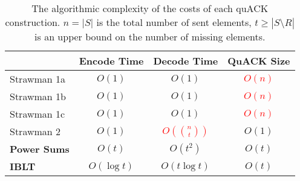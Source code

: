 \begin{table*}[ht]
  \centering

  \begin{subtable}[b]{\linewidth}
  \centering
  \begin{tabular}{lccc}
    \toprule
    & \bf Encode Time & \bf Decode Time & \bf QuACK Size \\
    \midrule
    Strawman 1a & $O(1)$ & $O(1)$ & \textcolor{red}{$O(n)$} \\
    Strawman 1b & $O(1)$ & $O(1)$ & \textcolor{red}{$O(n)$} \\
    Strawman 1c & $O(1)$ & $O(1)$ & \textcolor{red}{$O(n)$} \\
    Strawman 2 & $O(1)$ & \textcolor{red}{$O(\binom{n}{t})$} & $O(1)$ \\
    \bf \textcolor{black!50!blue}{Power Sums} & \bf \textcolor{black!50!blue}{$O(t)$} & \bf \textcolor{black!50!blue}{$O(t^2)$} & \bf \textcolor{black!50!blue}{$O(t)$} \\
    \bf \textcolor{black!50!blue}{IBLT} & \bf \textcolor{black!50!blue}{$O(\log t)$} & \bf \textcolor{black!50!blue}{$O(t\log t)$} & \bf \textcolor{black!50!blue}{$O(t)$} \\
    \bottomrule
  \end{tabular}
  \caption{The algorithmic complexity of the costs of each quACK construction.
  $n = |S|$ is the total number of sent elements, $t \geq |S \setminus R|$ is an
  upper bound on the number of missing elements.\\
  }
  \label{tab:quack:overview:theoretical}
  \end{subtable}


\end{table*}
